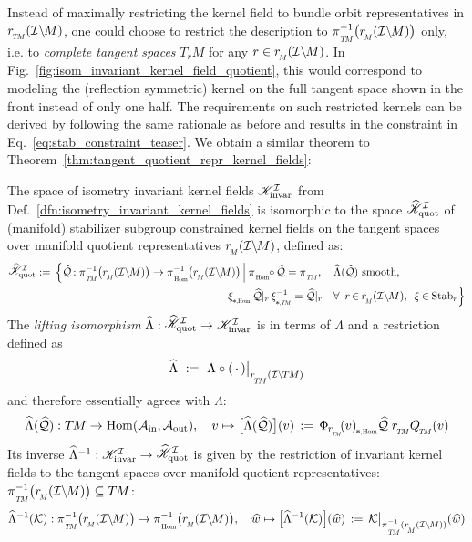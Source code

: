 Instead of maximally restricting the kernel field to bundle orbit representatives in $\rTM(\IM)$, one could choose to restrict the description to $\piTM^{-1}\big( \rM(\IM) \big)$ only, i.e. to \emph{complete tangent spaces} $T_rM$ for any $r\in \rM(\IM)$.
In Fig.~\eqref{fig:isom_invariant_kernel_field_quotient}, this would correspond to modeling the (reflection symmetric) kernel on the full tangent space shown in the front instead of only one half.
The requirements on such restricted kernels can be derived by following the same rationale as before and results in the constraint in Eq.~\eqref{eq:stab_constraint_teaser}.
We obtain a similar theorem to Theorem~\eqref{thm:tangent_quotient_repr_kernel_fields}:


\begin{thm}
\label{thm:manifold_quotient_repr_kernel_fields}
    The space of isometry invariant kernel fields $\mathscr{K}_\textup{invar}^{\mathcal{I}}$ from Def.~\ref{dfn:isometry_invariant_kernel_fields} is isomorphic to the space $\KIquothat$ of (manifold) stabilizer subgroup constrained kernel fields on the tangent spaces over manifold quotient representatives $\rM(\IM)$, defined as:
    \begin{align}\label{eq:KIquothat_def}
        \KIquothat :=\,
            \Big\{ \Qhat \mkern-2mu: \piTM^{-1}\big( \rM(\IM) \big) \to \piHom^{-1}\big( \rM(\IM) \big) \,\Big|\:& 
            \piHom \mkern-5mu\circ\mkern-1mu \Qhat = \piTM,\quad
            \widehat{\Lambda}(\Qhat)\ \textup{smooth}, \\ &
            \mkern-34mu
            \dxiHom \Qhat|_r\, \dxiTM^{-1} = \Qhat|_r \quad \forall\,\ r \mkern-2mu\in\mkern-1mu \rM(\IM),\,\ \xi \mkern-1mu\in\mkern-1mu \Stab{r}
            \!\Big\} \notag
    \end{align}
    The \emph{lifting isomorphism} $\widehat{\Lambda}: \KIquothat \to \KIfull$ is in terms of $\Lambda$ and a restriction defined as
    \begin{align}
        \widehat{\Lambda}\ :=\ \Lambda \circ (\,\cdot\,)\big|_{\rTM(\ITM)}
    \end{align}
    and therefore essentially agrees with $\Lambda$\textup{:}
    \begin{align}\label{eq:lifting_isomorphism_hat}
        \widehat{\Lambda}(\Qhat): \TM \to \Hom(\Ain,\Aout),\ \ \ 
        v \mapsto \big[ \widehat{\Lambda}(\Qhat) \big](v) \,:=\, \dPhirHom{v} \Qhat\; \rTM \QTM(v)
    \end{align}
    Its inverse $\widehat{\Lambda}^{-1}: \KIfull \to \KIquothat$ is given by the restriction of invariant kernel fields to 
    the tangent spaces over manifold quotient representatives:
    $\piTM^{-1}\big(\rM(\IM)\big) \subseteq \TM$:
    \begin{align}
        \widehat{\Lambda}^{-1}(\K): \piTM^{-1}\big(\rM(\IM)\big) \to \piHom^{-1}\big( \rM(\IM) \big),\ \ \ 
        \widehat{w} \mapsto \pig[ \widehat{\Lambda}^{-1}(\K) \pig](\widehat{w}) \,:=\, \K\big|_{\piTM^{-1}(\rM(\IM))}(\widehat{w})
    \end{align}
\end{thm}
